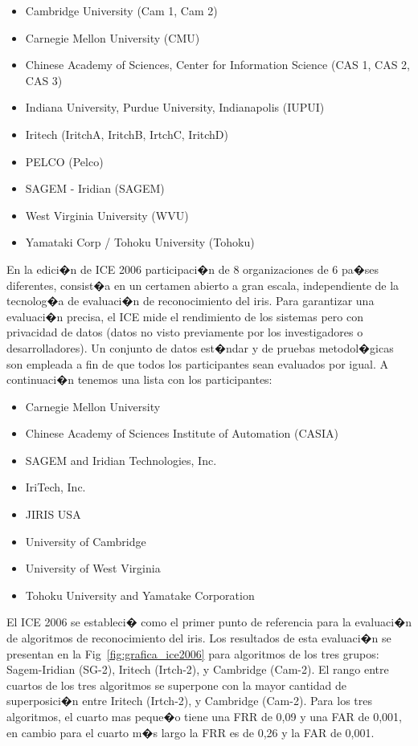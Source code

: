 \begin{itemize}
    \item Cambridge University (Cam 1, Cam 2)
    \item Carnegie Mellon University (CMU)
    \item Chinese Academy of Sciences, Center for Information Science (CAS 1, CAS 2, CAS 3)
    \item Indiana University, Purdue University, Indianapolis (IUPUI)
    \item Iritech (IritchA, IritchB, IrtchC, IritchD)
    \item PELCO (Pelco)
    \item SAGEM - Iridian (SAGEM)
    \item West Virginia University (WVU)
    \item Yamataki Corp / Tohoku University (Tohoku)
\end{itemize}

En la edici�n de ICE 2006 participaci�n de 8 organizaciones de 6 pa�ses diferentes, consist�a en un certamen abierto a gran escala, independiente de la tecnolog�a de evaluaci�n de reconocimiento del iris. Para garantizar una evaluaci�n precisa, el ICE mide el rendimiento de los sistemas pero con privacidad de datos (datos no visto previamente por los investigadores o desarrolladores). Un conjunto de datos est�ndar y de pruebas metodol�gicas son empleada a fin de que todos los participantes sean evaluados por igual. A continuaci�n tenemos una lista con los participantes:

\begin{itemize}
    \item Carnegie Mellon University
    \item Chinese Academy of Sciences Institute of Automation (CASIA)
    \item SAGEM and Iridian Technologies, Inc.
    \item IriTech, Inc.
    \item JIRIS USA
    \item University of Cambridge
    \item University of West Virginia
    \item Tohoku University and Yamatake Corporation
\end{itemize}

El ICE 2006 se estableci� como el primer punto de referencia para la evaluaci�n de algoritmos de reconocimiento del iris. Los resultados de esta evaluaci�n se presentan en la Fig~\ref{fig:grafica_ice2006} para algoritmos de los tres grupos: Sagem-Iridian (SG-2), Iritech (Irtch-2), y Cambridge (Cam-2). El rango entre cuartos de los tres algoritmos se superpone con la mayor cantidad de superposici�n entre Iritech (Irtch-2), y Cambridge (Cam-2). Para los tres algoritmos, el cuarto mas peque�o tiene una FRR de 0,09 y una FAR de 0,001, en cambio para el cuarto m�s largo la FRR es de 0,26 y la FAR de 0,001.

